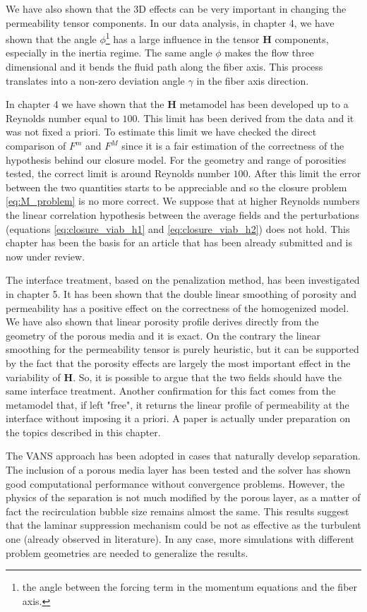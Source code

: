 We have also shown that the 3D effects can be very important in changing the permeability tensor components. In our data analysis, in chapter 4, we have shown that the angle $\phi$\footnote{the angle between the forcing term in the momentum equations and the fiber axis.} has a large influence in the tensor $\mathbf{H}$ components, especially in the inertia regime.
The same angle $\phi$ makes the flow three dimensional and it bends the fluid path along the fiber axis. This process translates into a non-zero deviation angle $\gamma$ in the fiber axis direction.

In chapter 4 we have shown that the $\mathbf{H}$ metamodel has been developed up to a Reynolds number equal to $100$. This limit has been derived from the data and it was not fixed a priori. To estimate this limit we have checked the direct comparison of $F^m$ and $F^M$ since it is a fair estimation of the correctness of the hypothesis behind our closure model. For the geometry and range of porosities tested, the correct limit is around Reynolds number $100$. After this limit the error between the two quantities starts to be appreciable and so the closure problem \eqref{eq:M_problem} is no more correct. We suppose that at higher Reynolds numbers the linear correlation hypothesis between the average fields and the perturbations (equations \eqref{eq:closure_viab_h1} and \eqref{eq:closure_viab_h2}) does not hold.
This chapter has been the basis for an article that has been already submitted and is now under review.

The interface treatment, based on the penalization method, has been investigated in chapter 5. It has been shown that the double linear smoothing of porosity and permeability has a positive effect on the correctness of the homogenized model. We have also shown that linear porosity profile derives directly from the geometry of the porous media and it is exact. On the contrary the linear smoothing for the permeability tensor is purely heuristic, but it can be supported by the fact that the porosity effects are largely the most important effect in the variability of $\mathbf{H}$. So, it is possible to argue that the two fields should have the same interface treatment. Another confirmation for this fact comes from the metamodel that, if left "free", it returns the linear profile of permeability at the interface without imposing it a priori. A paper is actually under preparation on the topics described in this chapter.
 
The VANS approach has been adopted in cases that naturally develop separation. The inclusion of a porous media layer has been tested and the solver has shown good computational performance without convergence problems. However, the physics of the separation is not much modified by the porous layer, as a matter of fact the recirculation bubble size remains almost the same. This results suggest that the laminar suppression mechanism could be not as effective as the turbulent one (already observed in literature). In any case, more simulations with different problem geometries are needed to generalize the results.

